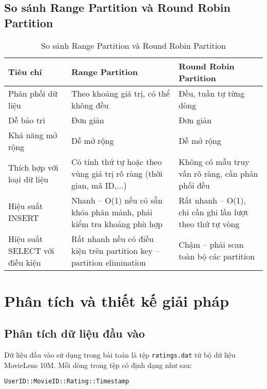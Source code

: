 \documentclass[14pt]{extarticle}
\begin{document}
\subsection{So sánh Range Partition và Round Robin Partition}
\begin{table}[H]
    \centering
    \renewcommand{\arraystretch}{1.5}
    \begin{tabular}{|>{\centering\arraybackslash}p{3.5cm}|>{\centering\arraybackslash}p{5.2cm}|>{\centering\arraybackslash}p{5.2cm}|}
        \hline
        \textbf{Tiêu chí} & \textbf{Range Partition} & \textbf{Round Robin Partition} \\
        \hline
        Phân phối dữ liệu & Theo khoảng giá trị, có thể không đều & Đều, tuần tự từng dòng \\
        \hline
        Dễ bảo trì & Đơn giản & Đơn giản \\
        \hline
        Khả năng mở rộng & Dễ mở rộng & Dễ mở rộng \\
        \hline
        Thích hợp với loại dữ liệu & Có tính thứ tự hoặc theo vùng giá trị rõ ràng (thời gian, mã ID,...) & Không có mẫu truy vấn rõ ràng, cần phân phối đều \\
        \hline
        Hiệu suất INSERT & Nhanh – O(1) nếu có sẵn khóa phân mảnh, phải kiểm tra khoảng phù hợp & Rất nhanh – O(1), chỉ cần ghi lần lượt theo thứ tự vòng \\
        \hline
        Hiệu suất SELECT với điều kiện & Rất nhanh nếu có điều kiện trên partition key – partition elimination & Chậm – phải scan toàn bộ các partition \\
        \hline
    \end{tabular}
    \caption{So sánh Range Partition và Round Robin Partition}
\end{table}
\clearpage

\section{Phân tích và thiết kế giải pháp}
\subsection{Phân tích dữ liệu đầu vào}

Dữ liệu đầu vào sử dụng trong bài toán là tệp \texttt{ratings.dat} từ bộ dữ liệu MovieLens 10M. Mỗi dòng trong tệp có định dạng như sau:

\begin{center}
\texttt{UserID::MovieID::Rating::Timestamp}
\end{center}
\end{document}

